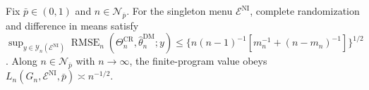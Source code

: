 Fix \(\bar p\in(0,1)\) and \(n\in\mathcal N_{\bar p}\). For the singleton menu \(\mathcal E^{\mathrm{NI}}\), complete randomization and difference in means satisfy \(\sup_{y\in\mathcal Y_n(\mathcal E^{\mathrm{NI}})}\operatorname{RMSE}_n(\Theta_n^{\mathrm{CR}},\widehat\theta_n^{\mathrm{DM}};y)\le\{n(n-1)^{-1}[m_n^{-1}+(n-m_n)^{-1}]\}^{1/2}\). Along \(n\in\mathcal N_{\bar p}\) with \(n\to\infty\), the finite-program value obeys \(L_n(G_n,\mathcal E^{\mathrm{NI}},\bar p)\asymp n^{-1/2}\).